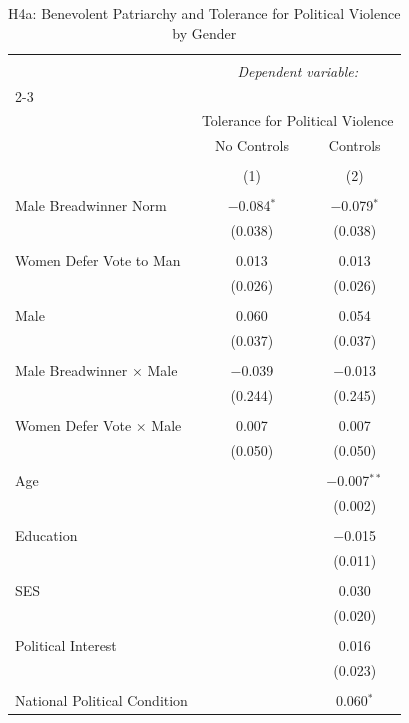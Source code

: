 
\begin{table}[!htbp] \centering 
  \caption{H4a: Benevolent Patriarchy and Tolerance for Political Violence by Gender} 
  \label{tab:h4a} 
\begin{tabular}{@{\extracolsep{5pt}}lcc} 
\\[-1.8ex]\hline 
\hline \\[-1.8ex] 
 & \multicolumn{2}{c}{\textit{Dependent variable:}} \\ 
\cline{2-3} 
\\[-1.8ex] & \multicolumn{2}{c}{Tolerance for Political Violence} \\ 
 & No Controls & Controls \\ 
\\[-1.8ex] & (1) & (2)\\ 
\hline \\[-1.8ex] 
 Male Breadwinner Norm & $-$0.084$^{*}$ & $-$0.079$^{*}$ \\ 
  & (0.038) & (0.038) \\ 
  & & \\ 
 Women Defer Vote to Man & 0.013 & 0.013 \\ 
  & (0.026) & (0.026) \\ 
  & & \\ 
 Male & 0.060 & 0.054 \\ 
  & (0.037) & (0.037) \\ 
  & & \\ 
 Male Breadwinner × Male & $-$0.039 & $-$0.013 \\ 
  & (0.244) & (0.245) \\ 
  & & \\ 
 Women Defer Vote × Male & 0.007 & 0.007 \\ 
  & (0.050) & (0.050) \\ 
  & & \\ 
 Age &  & $-$0.007$^{**}$ \\ 
  &  & (0.002) \\ 
  & & \\ 
 Education &  & $-$0.015 \\ 
  &  & (0.011) \\ 
  & & \\ 
 SES &  & 0.030 \\ 
  &  & (0.020) \\ 
  & & \\ 
 Political Interest &  & 0.016 \\ 
  &  & (0.023) \\ 
  & & \\ 
 National Political Condition &  & 0.060$^{*}$ \\ 

\end{tabular}
\end{table}

